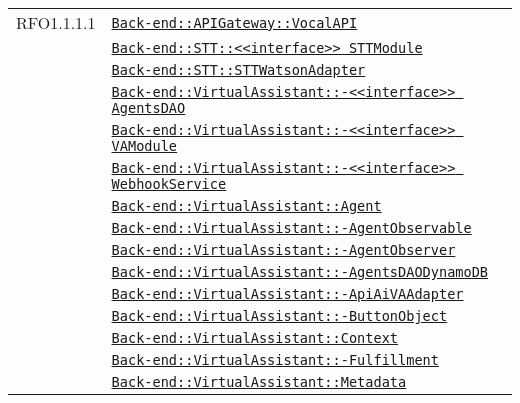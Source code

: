 \begin{longtable}{|>{\centering}m{3cm}|m{10cm}<{\centering}|}
RFO1.1.1.1 & \hyperref[Back-end::APIGateway::VocalAPI]{\texttt{Back-end::APIGateway::VocalAPI}}\\
& \hyperref[Back-end::STT::<<interface>> STTModule]{\texttt{Back-end::STT::<<interface>> STTModule}}\\
& \hyperref[Back-end::STT::STTWatsonAdapter]{\texttt{Back-end::STT::STTWatsonAdapter}}\\
& \hyperref[Back-end::VirtualAssistant::<<interface>> AgentsDAO]{\texttt{Back-end::VirtualAssistant::-\linebreak <<interface>> AgentsDAO}}\\
& \hyperref[Back-end::VirtualAssistant::<<interface>> VAModule]{\texttt{Back-end::VirtualAssistant::-\linebreak <<interface>> VAModule}}\\
& \hyperref[Back-end::VirtualAssistant::<<interface>> WebhookService]{\texttt{Back-end::VirtualAssistant::-\linebreak <<interface>> WebhookService}}\\
& \hyperref[Back-end::VirtualAssistant::Agent]{\texttt{Back-end::VirtualAssistant::Agent}}\\
& \hyperref[Back-end::VirtualAssistant::AgentObservable]{\texttt{Back-end::VirtualAssistant::-\linebreak AgentObservable}}\\
& \hyperref[Back-end::VirtualAssistant::AgentObserver]{\texttt{Back-end::VirtualAssistant::-\linebreak AgentObserver}}\\
& \hyperref[Back-end::VirtualAssistant::AgentsDAODynamoDB]{\texttt{Back-end::VirtualAssistant::-\linebreak AgentsDAODynamoDB}}\\
& \hyperref[Back-end::VirtualAssistant::ApiAiVAAdapter]{\texttt{Back-end::VirtualAssistant::-\linebreak ApiAiVAAdapter}}\\
& \hyperref[Back-end::VirtualAssistant::ButtonObject]{\texttt{Back-end::VirtualAssistant::-\linebreak ButtonObject}}\\
& \hyperref[Back-end::VirtualAssistant::Context]{\texttt{Back-end::VirtualAssistant::Context}}\\
& \hyperref[Back-end::VirtualAssistant::Fulfillment]{\texttt{Back-end::VirtualAssistant::-\linebreak Fulfillment}}\\
& \hyperref[Back-end::VirtualAssistant::Metadata]{\texttt{Back-end::VirtualAssistant::Metadata}}\\

\end{longtable}
